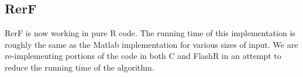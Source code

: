 \documentclass[simplex.tex]{subfiles}
\begin{document}
\subsection{RerF}

RerF is now working in pure R code.  The running time of this
implementation is roughly the same as the Matlab implementation for
various sizes of input.  We are re-implementing portions of the code in
both C and FlashR in an attempt to reduce the running time of the
algorithm.


\clearpage
\end{document}
